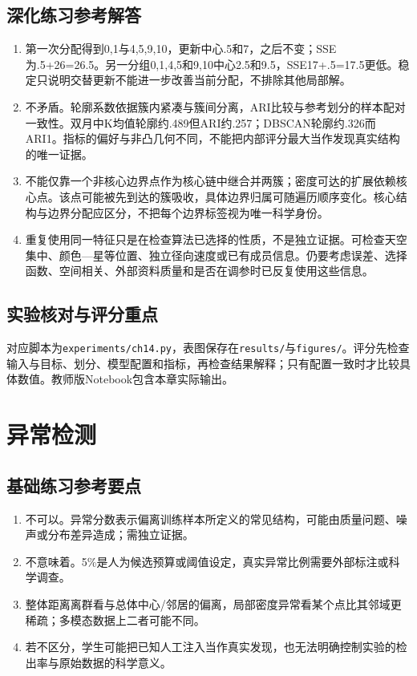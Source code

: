 \section*{深化练习参考解答}
\begin{enumerate}[label=D\arabic*.]
\item 第一次分配得到{0,1}与{4,5,9,10}，更新中心.5和7，之后不变；SSE为.5+26=26.5。另一分组{0,1,4,5}和{9,10}中心2.5和9.5，SSE17+.5=17.5更低。稳定只说明交替更新不能进一步改善当前分配，不排除其他局部解。
\item 不矛盾。轮廓系数依据簇内紧凑与簇间分离，ARI比较与参考划分的样本配对一致性。双月中K均值轮廓约.489但ARI约.257；DBSCAN轮廓约.326而ARI1。指标的偏好与非凸几何不同，不能把内部评分最大当作发现真实结构的唯一证据。
\item 不能仅靠一个非核心边界点作为核心链中继合并两簇；密度可达的扩展依赖核心点。该点可能被先到达的簇吸收，具体边界归属可随遍历顺序变化。核心结构与边界分配应区分，不把每个边界标签视为唯一科学身份。
\item 重复使用同一特征只是在检查算法已选择的性质，不是独立证据。可检查天空集中、颜色—星等位置、独立径向速度或已有成员信息。仍要考虑误差、选择函数、空间相关、外部资料质量和是否在调参时已反复使用这些信息。
\end{enumerate}

\section*{实验核对与评分重点}
对应脚本为\texttt{experiments/ch14.py}，表图保存在\texttt{results/}与\texttt{figures/}。评分先检查输入与目标、划分、模型配置和指标，再检查结果解释；只有配置一致时才比较具体数值。教师版Notebook包含本章实际输出。

\chapter{异常检测}
\section*{基础练习参考要点}
\begin{enumerate}[label=\arabic*.]
\item 不可以。异常分数表示偏离训练样本所定义的常见结构，可能由质量问题、噪声或分布差异造成；需独立证据。
\item 不意味着。5\%是人为候选预算或阈值设定，真实异常比例需要外部标注或科学调查。
\item 整体距离离群看与总体中心/邻居的偏离，局部密度异常看某个点比其邻域更稀疏；多模态数据上二者可能不同。
\item 若不区分，学生可能把已知人工注入当作真实发现，也无法明确控制实验的检出率与原始数据的科学意义。
\end{enumerate}

